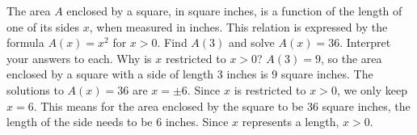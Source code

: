 {The area $A$ enclosed by a square, in square inches,  is a function of the length of one of its sides $x$, when measured in inches.  This relation is expressed by the formula $A(x) = x^2$ for $x > 0$.  Find $A(3)$ and solve $A(x) = 36$.  Interpret your answers to each.  Why is $x$ restricted to $x > 0$?}
{$A(3) = 9$, so the area enclosed by a square with a side of length $3$ inches is $9$ square inches.  The solutions to $A(x) = 36$ are $x = \pm 6$.  Since $x$ is restricted to  $x > 0$, we only keep $x = 6$.  This means for the area enclosed by the square to be $36$ square inches, the length of the side needs to be $6$ inches.  Since $x$ represents a length, $x > 0$.}
